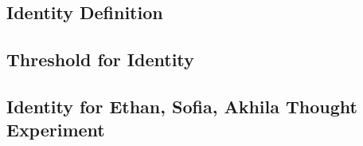 \documentclass[
	letterpaper, %
]{jdf}
\begin{document}

\subsection{Identity Definition}
\subsection{Threshold for Identity}
\subsection{Identity for Ethan, Sofia, Akhila Thought Experiment}

\end{document}

